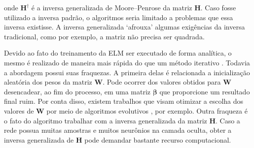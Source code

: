 onde \(\mathbf{H}^{\dagger}\) é a inversa generalizada de Moore–Penrose \cite{serre2010matrices} da matriz \(\mathbf{H}\). Caso fosse utilizado a inversa padrão, o algoritmos seria limitado a problemas que essa inversa existisse. A inversa generalizada ‘afrouxa’ algumas exigências da inversa tradicional, como por exemplo, a matriz não precisa ser quadrada.

Devido ao fato do treinamento da ELM ser executado de forma analítica, o mesmo é realizado de maneira mais rápida do que um método iterativo \cite{HUANG2006489}. Todavia a abordagem possui suas fraquezas. A primeira delas é relacionada a inicialização aleatória dos pesos da matriz \(\mathbf{W}\). Pode ocorrer dos valores obtidos para \(\mathbf{W}\) desencadear, ao fim do processo, em uma matriz \(\boldsymbol{\beta}\) que proporcione um resultado final ruim. Por conta disso, existem trabalhos que visam otimizar a escolha dos valores de \(\mathbf{W}\) por meio de algoritmos evolutivos \cite{HAN201387}, por exemplo. Outra fraqueza é o fato do algoritmo trabalhar com a inversa generalizada da matriz \(\mathbf{H}\). Caso a rede possua muitas amostras e muitos neurônios na camada oculta, obter a inversa generalizada de \(\mathbf{H}\) pode demandar bastante recurso computacional.